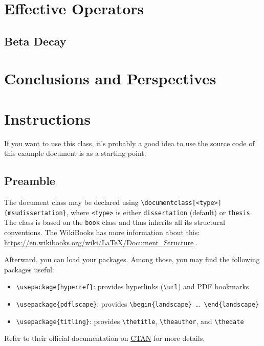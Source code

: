 \documentclass[dissertation]{msudissertation}
\begin{document}
\chapter{Effective Operators} \label{chapter:effectiveoperators}


\section{Beta Decay} \label{chapter:betadecay}


\chapter{Conclusions and Perspectives} \label{chapter:conclusions}

\chapter{Instructions} \label{chapter:instructions}

If you want to use this class, it's probably a good idea to use the source code of this example document is as a starting point.

\section{Preamble}

The document class may be declared using \verb|\documentclass[<type>]{msudissertation}|, where \texttt{<type>} is either \texttt{dissertation} (default) or \texttt{thesis}.  The class is based on the \texttt{book} class and thus inherits all its structural conventions.  The WikiBooks has more information about this: \url{https://en.wikibooks.org/wiki/LaTeX/Document_Structure} .

Afterward, you can load your packages.  Among those, you may find the following packages useful:
\begin{itemize}
\item \verb|\usepackage{hyperref}|: provides hyperlinks (\verb|\url|) and PDF bookmarks
\item \verb|\usepackage{pdflscape}|: provides \verb|\begin{landscape} |\ldots\verb| \end{landscape}|
\item \verb|\usepackage{titling}|: provides \verb|\thetitle|, \verb|\theauthor|, and \verb|\thedate|
\end{itemize}
Refer to their official documentation on \href{https://www.ctan.org}{CTAN} for more details.
\end{document}
